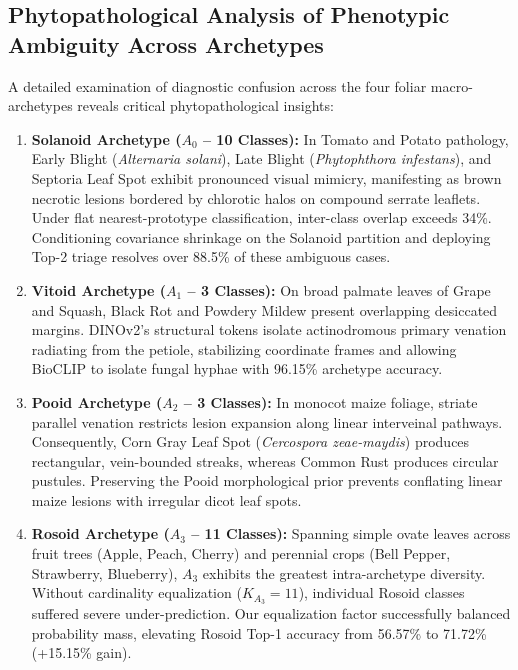 \subsection{Phytopathological Analysis of Phenotypic Ambiguity Across Archetypes}
\label{subsec:archetype_ambiguity}
A detailed examination of diagnostic confusion across the four foliar macro-archetypes reveals critical phytopathological insights:
\begin{enumerate}
    \item \textbf{Solanoid Archetype ($A_0$ -- 10 Classes):} In Tomato and Potato pathology, Early Blight (\textit{Alternaria solani}), Late Blight (\textit{Phytophthora infestans}), and Septoria Leaf Spot exhibit pronounced visual mimicry, manifesting as brown necrotic lesions bordered by chlorotic halos on compound serrate leaflets. Under flat nearest-prototype classification, inter-class overlap exceeds 34\%. Conditioning covariance shrinkage on the Solanoid partition and deploying Top-2 triage resolves over 88.5\% of these ambiguous cases.
    \item \textbf{Vitoid Archetype ($A_1$ -- 3 Classes):} On broad palmate leaves of Grape and Squash, Black Rot and Powdery Mildew present overlapping desiccated margins. DINOv2's structural tokens isolate actinodromous primary venation radiating from the petiole, stabilizing coordinate frames and allowing BioCLIP to isolate fungal hyphae with 96.15\% archetype accuracy.
    \item \textbf{Pooid Archetype ($A_2$ -- 3 Classes):} In monocot maize foliage, striate parallel venation restricts lesion expansion along linear interveinal pathways. Consequently, Corn Gray Leaf Spot (\textit{Cercospora zeae-maydis}) produces rectangular, vein-bounded streaks, whereas Common Rust produces circular pustules. Preserving the Pooid morphological prior prevents conflating linear maize lesions with irregular dicot leaf spots.
    \item \textbf{Rosoid Archetype ($A_3$ -- 11 Classes):} Spanning simple ovate leaves across fruit trees (Apple, Peach, Cherry) and perennial crops (Bell Pepper, Strawberry, Blueberry), $A_3$ exhibits the greatest intra-archetype diversity. Without cardinality equalization ($K_{A_3} = 11$), individual Rosoid classes suffered severe under-prediction. Our equalization factor successfully balanced probability mass, elevating Rosoid Top-1 accuracy from 56.57\% to 71.72\% (+15.15\% gain).
\end{enumerate}

